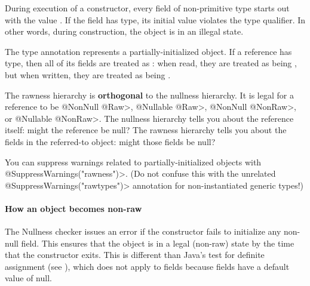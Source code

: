During execution of a constructor, every field of non-primitive type starts
out with the value .  If the field has
 type, its initial value 
violates the  type qualifier.  In other words, during
construction, the object is in an illegal state.


The  type annotation represents a
partially-initialized object.  If a reference has
 type, then all of its  fields are treated as
:  when read, they are
treated as being , but when
written, they are treated as being
.


The rawness hierarchy is \textbf{orthogonal} to the nullness hierarchy.  It
is legal for a reference to be \<@NonNull @Raw>, \<@Nullable @Raw>,
\<@NonNull @NonRaw>, or \<@Nullable @NonRaw>.  The nullness hierarchy tells
you about the reference itself:  might the reference be null?
The rawness hierarchy tells you about the fields in the referred-to object:
might those fields be null?




You can suppress warnings related to partially-initialized objects with
\<@SuppressWarnings("rawness")>.  (Do not confuse this with the unrelated
\<@SuppressWarnings("rawtypes")> annotation for non-instantiated generic types!)


\paragraph{How an object becomes non-raw}

The Nullness checker issues an error if the constructor fails to initialize
any non-null field.  This ensures that the object is in a legal (non-raw)
state by the time that the constructor exits.
This is different than Java's test for definite assignment  (see 
),
which does not apply to fields because fields have a default value
of null.


